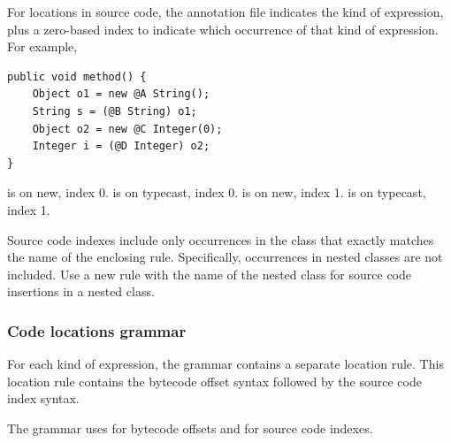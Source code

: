 \documentclass{article}
\newcommand{\code}[1]{\ifmmode{\mbox{\relax\ttfamily{#1}}}\else{\relax\ttfamily #1}\fi}
\newcommand{\code}[1]{\texttt{#1}}
\begin{document}
For locations in source code, the annotation file indicates the kind of
expression, plus a zero-based index to indicate which occurrence of that kind of
expression. For example,

\begin{verbatim}
public void method() {
    Object o1 = new @A String();
    String s = (@B String) o1;
    Object o2 = new @C Integer(0);
    Integer i = (@D Integer) o2;
}
\end{verbatim}

\noindent
\code{@A} is on new, index 0. \code{@B} is on typecast, index 0. \code{@C} is on
new, index 1. \code{@D} is on typecast, index 1.

Source code indexes include only occurrences in the class that exactly matches
the name of the enclosing  rule. Specifically,
occurrences in nested classes are not included. Use a new
 rule with the name of the nested class for source code
insertions in a nested class.


\subsubsection{Code locations grammar}\label{code-grammar}

For each kind of expression, the grammar contains a separate location rule.
This location rule contains the bytecode offset syntax followed by the
source code index syntax.

The grammar uses \bnflit{\#} for bytecode offsets and \bnflit{*} for source code indexes.
\end{document}
